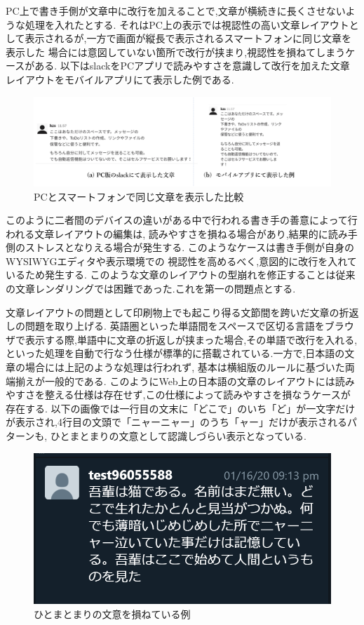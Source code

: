 PC上で書き手側が文章中に改行を加えることで,文章が横続きに長くさせないような処理を入れたとする.
それはPC上の表示では視認性の高い文章レイアウトとして表示されるが,一方で画面が縦長で表示されるスマートフォンに同じ文章を表示した
場合には意図していない箇所で改行が挟まり,視認性を損ねてしまうケースがある.
以下はslack\footnotemark[2]をPCアプリで読みやすさを意識して改行を加えた文章レイアウトをモバイルアプリにて表示した例である.



\begin{figure}[H]
    \centering
    \label{fig:image5}
    \includegraphics[width=0.9\columnwidth]{image/01/img3.png}
    \caption[PCとスマートフォンで同じ文章を表示した比較] {PCとスマートフォンで同じ文章を表示した比較}
\end{figure}

このように二者間のデバイスの違いがある中で行われる書き手の善意によって行われる文章レイアウトの編集は,
読みやすさを損ねる場合があり,結果的に読み手側のストレスとなりえる場合が発生する.
このようなケースは書き手側が自身のWYSIWYGエディタや表示環境での
視認性を高めるべく,意図的に改行を入れているため発生する.
このような文章のレイアウトの型崩れを修正することは従来の文章レンダリングでは困難であった.これを第一の問題点とする.


文章レイアウトの問題として印刷物上でも起こり得る文節間を跨いだ文章の折返しの問題を取り上げる.
英語圏といった単語間をスペースで区切る言語をブラウザで表示する際,単語中に文章の折返しが挟まった場合,その単語で改行を入れる,
といった処理を自動で行なう仕様が標準的に搭載されている.一方で,日本語の文章の場合には上記のような処理は行われず,
基本は横組版のルールに基づいた両端揃えが一般的である.
このようにWeb上の日本語の文章のレイアウトには読みやすさを整える仕様は存在せず,この仕様によって読みやすさを損なうケースが存在する.
以下の画像では一行目の文末に「どこで」のいち「ど」が一文字だけが表示され,4行目の文頭で「ニャーニャー」のうち「ャー」だけが表示されるパターンも,
ひとまとまりの文意として認識しづらい表示となっている.

\begin{figure}[H]
        \centering
        \label{fig:sokoneteiru}
        \includegraphics[width=0.7\columnwidth]{image/01/img5.png}
        \caption[ひとまとまりの文意を損ねている例] {ひとまとまりの文意を損ねている例}
\end{figure}

